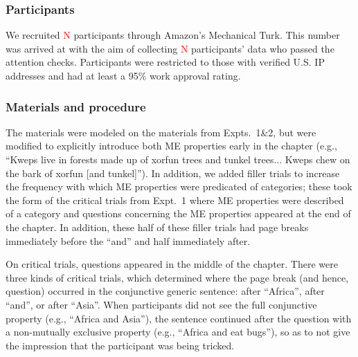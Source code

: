 \documentclass[10pt,letterpaper]{article}
\newcommand{\red}[1]{{\textcolor{Red}{#1}}}
\begin{document}
\subsubsection{Participants}

We recruited \red{N} participants through Amazon's Mechanical Turk.
This number was arrived at with the aim of collecting \red{N} participants' data who passed the attention checks.  
Participants were restricted to those with verified U.S. IP addresses and had at least a 95\% work approval rating. 

\subsubsection{Materials and procedure}

The materials were modeled on the materials from Expts.~1\&2, but were modified to explicitly introduce both ME properties early in the chapter (e.g., ``Kweps live in forests made up of xorfun trees and tunkel trees... Kweps chew on the bark of xorfun [and tunkel]'').
In addition, we added filler trials to increase the frequency with which ME properties were predicated of categories; these took the form of the critical trials from Expt.~1 where ME properties were described of a category and questions concerning the ME properties appeared at the end of the chapter. 
In addition, these half of these filler trials had page breaks immediately before the ``and'' and half immediately after.

On critical trials, questions appeared in the middle of the chapter. 
There were three kinds of critical trials, which determined where the page break (and hence, question) occurred in the conjunctive generic sentence: after ``Africa'', after ``and'', or after ``Asia''. 
When participants did not see the full conjunctive property (e.g., ``Africa and Asia''), the sentence continued after the question with a non-mutually exclusive property (e.g., ``Africa and eat bugs''), so as to not give the impression that the participant was being tricked. 
\end{document}
